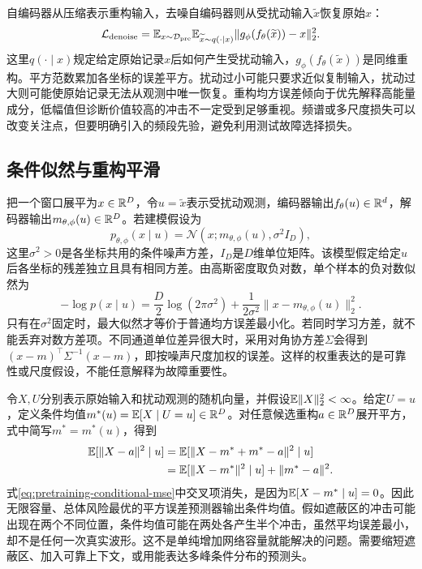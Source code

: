 自编码器从压缩表示重构输入，去噪自编码器则从受扰动输入$\widetilde x$恢复原始$x$\cite{vincent2008denoising}：
\begin{equation}
 \mathcal L_{\mathrm{denoise}}
 =\mathbb{E}_{x\sim\mathcal D_{\mathrm{pre}}}\mathbb{E}_{\widetilde x\sim q(\cdot\mid x)}
 \|g_\phi(f_\theta(\widetilde x))-x\|_2^2.
\end{equation}
这里$q(\cdot\mid x)$规定给定原始记录$x$后如何产生受扰动输入，$g_\phi(f_\theta(\widetilde x))$是同维重构。平方范数累加各坐标的误差平方。扰动过小可能只要求近似复制输入，扰动过大则可能使原始记录无法从观测中唯一恢复。重构均方误差倾向于优先解释高能量成分，低幅值但诊断价值较高的冲击不一定受到足够重视。频谱或多尺度损失可以改变关注点，但要明确引入的频段先验，避免利用测试故障选择损失。

\subsection{条件似然与重构平滑}
把一个窗口展平为$x\in\mathbb{R}^D$，令$u=\widetilde x$表示受扰动观测，编码器输出$f_\theta(u)\in\mathbb{R}^d$，解码器输出$m_{\theta,\phi}(u)\in\mathbb{R}^D$。若建模假设为
\begin{equation}
 p_{\theta,\phi}(x\mid u)=\mathcal N(x;m_{\theta,\phi}(u),\sigma^2 I_D),
\end{equation}
这里$\sigma^2>0$是各坐标共用的条件噪声方差，$I_D$是$D$维单位矩阵。该模型假定给定$u$后各坐标的残差独立且具有相同方差。由高斯密度取负对数，单个样本的负对数似然为
\begin{equation}
 -\log p(x\mid u)=\frac D2\log(2\pi\sigma^2)
 +\frac1{2\sigma^2}\|x-m_{\theta,\phi}(u)\|_2^2.
\end{equation}
只有在$\sigma^2$固定时，最大似然才等价于普通均方误差最小化。若同时学习方差，就不能丢弃对数方差项。不同通道单位差异很大时，采用对角协方差$\Sigma$会得到$(x-m)^\top\Sigma^{-1}(x-m)$，即按噪声尺度加权的误差。这样的权重表达的是可靠性或尺度假设，不能任意解释为故障重要性。

令$X,U$分别表示原始输入和扰动观测的随机向量，并假设$\mathbb{E}\|X\|_2^2<\infty$。给定$U=u$，定义条件均值$m^*(u)=\mathbb{E}[X\mid U=u]\in\mathbb{R}^D$。对任意候选重构$a\in\mathbb{R}^D$展开平方，式中简写$m^*=m^*(u)$，得到
\begin{align}
 \mathbb{E}[\|X-a\|^2\mid u]
 &=\mathbb{E}[\|X-m^*+m^*-a\|^2\mid u]\\
 &=\mathbb{E}[\|X-m^*\|^2\mid u]+\|m^*-a\|^2.\label{eq:pretraining-conditional-mse}
\end{align}
式\eqref{eq:pretraining-conditional-mse}中交叉项消失，是因为$\mathbb{E}[X-m^*\mid u]=0$。因此无限容量、总体风险最优的平方误差预测器输出条件均值。假如遮蔽区的冲击可能出现在两个不同位置，条件均值可能在两处各产生半个冲击，虽然平均误差最小，却不是任何一次真实波形。这不是单纯增加网络容量就能解决的问题。需要缩短遮蔽区、加入可靠上下文，或用能表达多峰条件分布的预测头。

